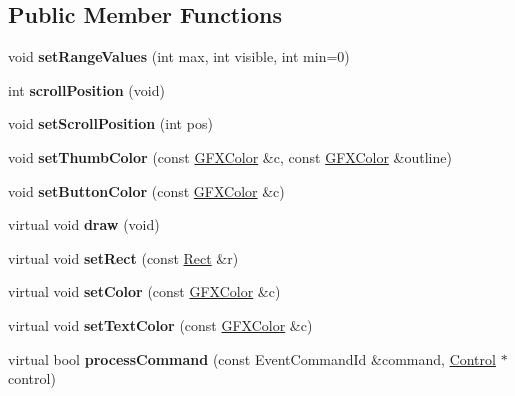 \subsection*{Public Member Functions}
\begin{DoxyCompactItemize}
\item 
void {\bfseries set\+Range\+Values} (int max, int visible, int min=0)\hypertarget{classScroller_ac3f2ca902a6c6c1ca3447946514913c7}{}\label{classScroller_ac3f2ca902a6c6c1ca3447946514913c7}

\item 
int {\bfseries scroll\+Position} (void)\hypertarget{classScroller_a46ffd9d6d7b19ccd971facbd62cd222b}{}\label{classScroller_a46ffd9d6d7b19ccd971facbd62cd222b}

\item 
void {\bfseries set\+Scroll\+Position} (int pos)\hypertarget{classScroller_a14913bbcc15d738e56c8f4772e860615}{}\label{classScroller_a14913bbcc15d738e56c8f4772e860615}

\item 
void {\bfseries set\+Thumb\+Color} (const \hyperlink{structGFXColor}{G\+F\+X\+Color} \&c, const \hyperlink{structGFXColor}{G\+F\+X\+Color} \&outline)\hypertarget{classScroller_ab6f026ae0f806b0cb07a88948d3230ae}{}\label{classScroller_ab6f026ae0f806b0cb07a88948d3230ae}

\item 
void {\bfseries set\+Button\+Color} (const \hyperlink{structGFXColor}{G\+F\+X\+Color} \&c)\hypertarget{classScroller_aa546bd49df1b2e4887f0c5861f35892e}{}\label{classScroller_aa546bd49df1b2e4887f0c5861f35892e}

\item 
virtual void {\bfseries draw} (void)\hypertarget{classScroller_af73b25abcbe4897c59ffea47ee2eb0d1}{}\label{classScroller_af73b25abcbe4897c59ffea47ee2eb0d1}

\item 
virtual void {\bfseries set\+Rect} (const \hyperlink{classRect}{Rect} \&r)\hypertarget{classScroller_a95365fe558b860810aca61a8dea53323}{}\label{classScroller_a95365fe558b860810aca61a8dea53323}

\item 
virtual void {\bfseries set\+Color} (const \hyperlink{structGFXColor}{G\+F\+X\+Color} \&c)\hypertarget{classScroller_ac9b581d8139a6e0067ae06e6025eb79f}{}\label{classScroller_ac9b581d8139a6e0067ae06e6025eb79f}

\item 
virtual void {\bfseries set\+Text\+Color} (const \hyperlink{structGFXColor}{G\+F\+X\+Color} \&c)\hypertarget{classScroller_acb75d177658a6877853bc84168efeb9c}{}\label{classScroller_acb75d177658a6877853bc84168efeb9c}

\item 
virtual bool {\bfseries process\+Command} (const Event\+Command\+Id \&command, \hyperlink{classControl}{Control} $\ast$control)\hypertarget{classScroller_a71183773728d497f0c141f2c7cd4ea5d}{}\label{classScroller_a71183773728d497f0c141f2c7cd4ea5d}

\end{DoxyCompactItemize}
